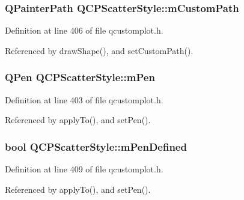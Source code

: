 \subsubsection[{m\+Custom\+Path}]{\setlength{\rightskip}{0pt plus 5cm}Q\+Painter\+Path Q\+C\+P\+Scatter\+Style\+::m\+Custom\+Path\hspace{0.3cm}{\ttfamily [protected]}}\label{class_q_c_p_scatter_style_a813cb074744dc5a2f59cc99d6a10c6f0}


Definition at line 406 of file qcustomplot.\+h.



Referenced by draw\+Shape(), and set\+Custom\+Path().

\hypertarget{class_q_c_p_scatter_style_a0f6a85e6d1e3ae1ca1b6efb4d4cdfe17}{}
\subsubsection[{m\+Pen}]{\setlength{\rightskip}{0pt plus 5cm}Q\+Pen Q\+C\+P\+Scatter\+Style\+::m\+Pen\hspace{0.3cm}{\ttfamily [protected]}}\label{class_q_c_p_scatter_style_a0f6a85e6d1e3ae1ca1b6efb4d4cdfe17}


Definition at line 403 of file qcustomplot.\+h.



Referenced by apply\+To(), and set\+Pen().

\hypertarget{class_q_c_p_scatter_style_a84ef5aa591ddba07b440f597e1669e78}{}
\subsubsection[{m\+Pen\+Defined}]{\setlength{\rightskip}{0pt plus 5cm}bool Q\+C\+P\+Scatter\+Style\+::m\+Pen\+Defined\hspace{0.3cm}{\ttfamily [protected]}}\label{class_q_c_p_scatter_style_a84ef5aa591ddba07b440f597e1669e78}


Definition at line 409 of file qcustomplot.\+h.



Referenced by apply\+To(), and set\+Pen().

\hypertarget{class_q_c_p_scatter_style_a7697346c89b19d4cd1d8dd33319ec9e3}{}
